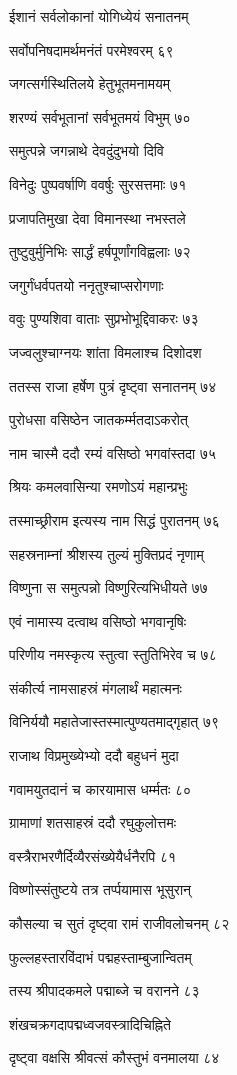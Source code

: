 ईशानं सर्वलोकानां योगिध्येयं सनातनम्

सर्वोपनिषदामर्थमनंतं परमेश्वरम् ६९

जगत्सर्गस्थितिलये हेतुभूतमनामयम्

शरण्यं सर्वभूतानां सर्वभूतमयं विभुम् ७०

समुत्पन्ने जगन्नाथे देवदुंदुभयो दिवि

विनेदुः पुष्पवर्षाणि ववर्षुः सुरसत्तमाः ७१

प्रजापतिमुखा देवा विमानस्था नभस्तले

तुष्टुवुर्मुनिभिः सार्द्धं हर्षपूर्णांगविह्वलाः ७२

जगुर्गंधर्वपतयो ननृतुश्चाप्सरोगणाः

ववुः पुण्यशिवा वाताः सुप्रभोभूद्दिवाकरः ७३

जज्वलुश्चाग्नयः शांता विमलाश्च दिशोदश

ततस्स राजा हर्षेण पुत्रं दृष्ट्वा सनातनम् ७४

पुरोधसा वसिष्ठेन जातकर्म्मतदाऽकरोत्

नाम चास्मै ददौ रम्यं वसिष्ठो भगवांस्तदा ७५

श्रियः कमलवासिन्या रमणोऽयं महान्प्रभुः

तस्माच्छ्रीराम इत्यस्य नाम सिद्धं पुरातनम् ७६

सहस्रनाम्नां श्रीशस्य तुल्यं मुक्तिप्रदं नृणाम्

विष्णुना स समुत्पन्नो विष्णुरित्यभिधीयते ७७

एवं नामास्य दत्वाथ वसिष्ठो भगवानृषिः

परिणीय नमस्कृत्य स्तुत्वा स्तुतिभिरेव च ७८

संकीर्त्य नामसाहस्रं मंगलार्थं महात्मनः

विनिर्ययौ महातेजास्तस्मात्पुण्यतमाद्गृहात् ७९

राजाथ विप्रमुख्येभ्यो ददौ बहुधनं मुदा

गवामयुतदानं च कारयामास धर्म्मतः ८०

ग्रामाणां शतसाहस्रं ददौ रघुकुलोत्तमः

वस्त्रैराभरणैर्दिव्यैरसंख्येयैर्धनैरपि ८१

विष्णोस्संतुष्टये तत्र तर्प्पयामास भूसुरान्

कौसल्या च सुतं दृष्ट्वा रामं राजीवलोचनम् ८२

फुल्लहस्तारविंदाभं पद्महस्ताम्बुजान्वितम्

तस्य श्रीपादकमले पद्माब्जे च वरानने ८३

शंखचक्रगदापद्मध्वजवस्त्रादिचिह्निते

दृष्ट्वा वक्षसि श्रीवत्सं कौस्तुभं वनमालया ८४

